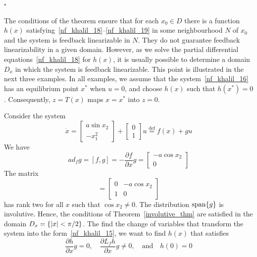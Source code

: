 \documentclass[12pt,a4paper,oneside]{book}
\begin{document}
\begin{onehalfspace}
\begin{thm}
		\hfill$\square$
\end{thm}

The conditions of the theorem ensure that for each $x_0\in D$ there is a function $h(x)$ satisfying~\eqref{nf_khalil_18}--\eqref{nf_khalil_19} in some neighbourhood $N$ of $x_0$ and the system is feedback linearizable in $N$. They do not guarantee feedback linearizability in a given domain. However, as we solve the partial differential equations~\eqref{nf_khalil_18} for $h(x)$, it is usually possible to determine a domain $D_x$ in which the system is feedback linearizable. This point is illustrated in the next three examples. In all examples, we assume that the system~\eqref{nf_khalil_16} has an equilibrium point $x^*$ when $u=0$, and choose $h(x)$ such that $h(x^*)=0$. Consequently, $z=T(x)$ maps $x=x^*$ into $z=0$.
\begin{example}
Consider the system
	\begin{equation*}
		\dot{x}=\begin{bmatrix} a\sin x_2 \\[6pt] -x_1^2 \end{bmatrix} + \begin{bmatrix} 0 \\[6pt] 1 \end{bmatrix}u\stackrel{\text{def}}{=}f(x)+gu
	\end{equation*}
We have
	\begin{equation*}
		ad_fg=[f,g]=-\frac{\partial f}{\partial x}g = \begin{bmatrix} -a\cos x_2 \\[6pt] 0 \end{bmatrix}
	\end{equation*}
The matrix
	\begin{equation*}
		[g,ad_fg]= \begin{bmatrix} 0 &-a\cos x_2 \\[6pt] 1 & 0 \end{bmatrix}
	\end{equation*}	
has rank two for all $x$ such that $\cos x_2\ne0$. The distribution $\operatorname{span}\{g\}$ is involutive. Hence, the conditions of Theorem~\ref{involutive_thm} are satisfied in the domain $D_x=\{\abs{x}<\pi/2\}$. The find the change of variables that transform the system into the form~\eqref{nf_khalil_15}, we want to find $h(x)$ that satisfies
\begin{equation*}
	\frac{\partial h}{\partial x}g=0,\quad\frac{\partial L_fh}{\partial x}g\ne0,\quad\text{and}\quad h(0)=0
\end{equation*}

\end{example}
\end{onehalfspace}
\end{document}
